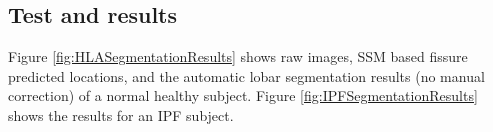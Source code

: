 {\subsection{Test and results}
Figure \ref{fig:HLASegmentationResults} shows raw images, SSM based fissure predicted locations, and the automatic lobar segmentation results (no manual correction) of a normal healthy subject. Figure \ref{fig:IPFSegmentationResults} shows the results for an IPF subject.

\begin{figure}[htbp] 
\centering
\begin{subfigure}{.25\linewidth}%

\end{subfigure}
\end{figure}}
